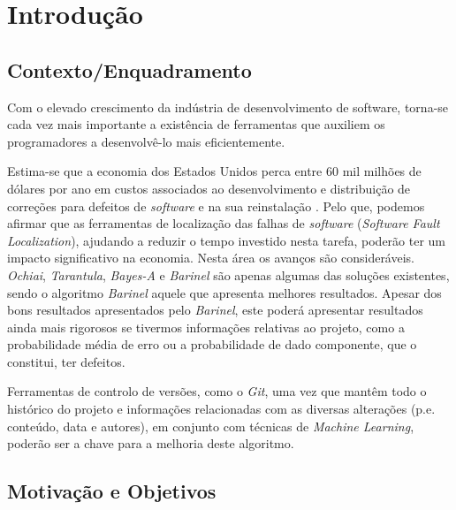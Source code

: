 \chapter{Introdução} \label{chap:intro}

\section*{}


\section{Contexto/Enquadramento} \label{sec:context}

Com o elevado crescimento da indústria de desenvolvimento de software,
torna-se cada vez mais importante a existência de ferramentas que auxiliem
os programadores a desenvolvê-lo mais eficientemente.

Estima-se que a economia dos Estados Unidos perca entre 60 mil milhões de dólares por ano em custos associados ao desenvolvimento e distribuição de correções para defeitos de \emph{software} e na sua reinstalação \cite{Zhivich2009}. Pelo que, podemos afirmar que as ferramentas de localização das falhas de \emph{software} (\emph{Software Fault Localization}), ajudando a reduzir o tempo investido nesta tarefa, poderão ter um impacto significativo na economia. %
Nesta área os avanços são consideráveis. \emph{Ochiai}, \emph{Tarantula}, \emph{Bayes-A} e \emph{Barinel} são apenas algumas das soluções existentes, sendo o algoritmo \emph{Barinel} aquele que apresenta melhores resultados. \cite{Abreu2009}
Apesar dos bons resultados apresentados pelo \emph{Barinel}, este poderá apresentar resultados ainda mais rigorosos se tivermos informações relativas ao projeto, como a probabilidade média de erro ou a probabilidade de dado componente, que o constitui, ter defeitos.

Ferramentas de controlo de versões, como o \emph{Git}, uma vez que mantêm todo o histórico do projeto e informações relacionadas com as diversas alterações (p.e. conteúdo, data e autores), em conjunto com técnicas de \emph{Machine Learning}, poderão ser a chave para a melhoria deste algoritmo.

\section{Motivação e Objetivos} \label{sec:goals}

